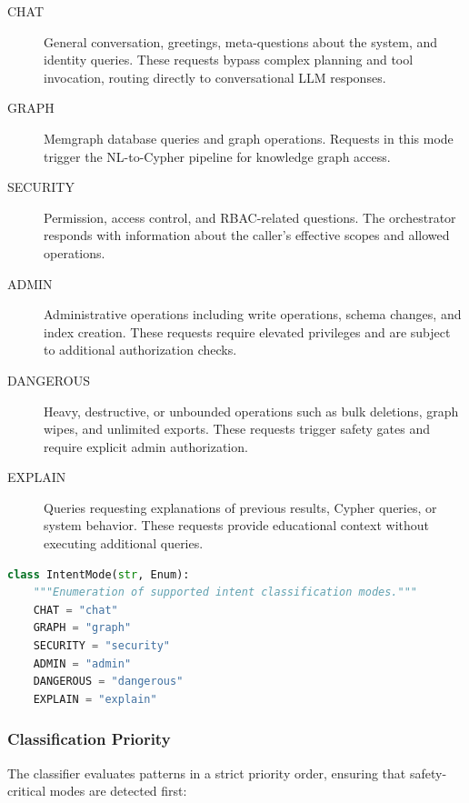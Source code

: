\documentclass[a4paper,twoside]{sapthesis}
\begin{document}
\begin{description}
    \item[CHAT] General conversation, greetings, meta-questions about the system, and identity queries. These requests bypass complex planning and tool invocation, routing directly to conversational LLM responses.
    
    \item[GRAPH] Memgraph database queries and graph operations. Requests in this mode trigger the NL-to-Cypher pipeline for knowledge graph access.
    
    \item[SECURITY] Permission, access control, and RBAC-related questions. The orchestrator responds with information about the caller's effective scopes and allowed operations.
    
    \item[ADMIN] Administrative operations including write operations, schema changes, and index creation. These requests require elevated privileges and are subject to additional authorization checks.
    
    \item[DANGEROUS] Heavy, destructive, or unbounded operations such as bulk deletions, graph wipes, and unlimited exports. These requests trigger safety gates and require explicit admin authorization.
    
    \item[EXPLAIN] Queries requesting explanations of previous results, Cypher queries, or system behavior. These requests provide educational context without executing additional queries.
\end{description}

\begin{lstlisting}[language=Python, caption={IntentMode enumeration}, label=lst:intent-mode-enum]
class IntentMode(str, Enum):
    """Enumeration of supported intent classification modes."""
    CHAT = "chat"
    GRAPH = "graph"
    SECURITY = "security"
    ADMIN = "admin"
    DANGEROUS = "dangerous"
    EXPLAIN = "explain"
\end{lstlisting}

\subsubsection{Classification Priority}

The classifier evaluates patterns in a strict priority order, ensuring that safety-critical modes are detected first:
\end{document}
